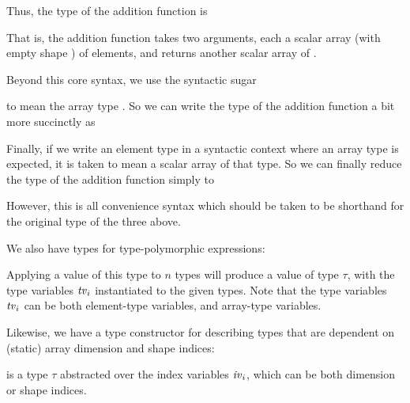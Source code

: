 Thus, the type of the addition function is
\begin{code}
\end{code}
That is, the addition function takes two arguments,
each a scalar array (with empty shape ) of  elements,
and returns another scalar array of .

Beyond this core syntax, we use the syntactic sugar
\begin{code}
[\(t\) \vi{i}{1} \ldots \vi{i}{n}]\end{code}
to mean the array type .
So we can write the type of the addition function a bit more succinctly as
\begin{code}
\ft{[int] [int]}{[int]}\end{code}
Finally, if we write an element type in a syntactic context where an array
type is expected, it is taken to mean a scalar array of that type.
So we can finally reduce the type of the addition function simply to
\begin{code}
\end{code}
However, this is all convenience syntax which should be taken to
be shorthand for the original type of the three above.

We also have types for type-polymorphic expressions:
\begin{code}
\end{code}
Applying a value of this type to $n$ types
will produce a value of type $\tau$,
with the type variables $\mathit{tv}_{i}$ instantiated to the given types.
Note that the type variables $\mathit{tv}_{i}$ can be both element-type variables,
and array-type variables.
      
Likewise, we have a type constructor for describing types that are dependent
on (static) array dimension and shape indices:
\begin{code}
\end{code}
is a type $\tau$ abstracted over the index variables $\mathit{iv}_{i}$,
which can be both dimension or shape indices.


